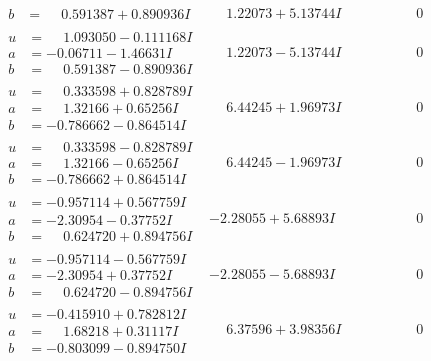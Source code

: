 \documentclass[1p]{elsarticle_modified}
\theoremstyle{definition}
\begin{document}
$$\begin{array}{c|c|c}
\begin{aligned}
b &= \phantom{-}0.591387 + 0.890936 I\end{aligned}
 & \phantom{-}1.22073 + 5.13744 I & \phantom{-0.000000 } 0 \\ \hline\begin{aligned}
u &= \phantom{-}1.093050 - 0.111168 I \\
a &= -0.06711 - 1.46631 I \\
b &= \phantom{-}0.591387 - 0.890936 I\end{aligned}
 & \phantom{-}1.22073 - 5.13744 I & \phantom{-0.000000 } 0 \\ \hline\begin{aligned}
u &= \phantom{-}0.333598 + 0.828789 I \\
a &= \phantom{-}1.32166 + 0.65256 I \\
b &= -0.786662 - 0.864514 I\end{aligned}
 & \phantom{-}6.44245 + 1.96973 I & \phantom{-0.000000 } 0 \\ \hline\begin{aligned}
u &= \phantom{-}0.333598 - 0.828789 I \\
a &= \phantom{-}1.32166 - 0.65256 I \\
b &= -0.786662 + 0.864514 I\end{aligned}
 & \phantom{-}6.44245 - 1.96973 I & \phantom{-0.000000 } 0 \\ \hline\begin{aligned}
u &= -0.957114 + 0.567759 I \\
a &= -2.30954 - 0.37752 I \\
b &= \phantom{-}0.624720 + 0.894756 I\end{aligned}
 & -2.28055 + 5.68893 I & \phantom{-0.000000 } 0 \\ \hline\begin{aligned}
u &= -0.957114 - 0.567759 I \\
a &= -2.30954 + 0.37752 I \\
b &= \phantom{-}0.624720 - 0.894756 I\end{aligned}
 & -2.28055 - 5.68893 I & \phantom{-0.000000 } 0 \\ \hline\begin{aligned}
u &= -0.415910 + 0.782812 I \\
a &= \phantom{-}1.68218 + 0.31117 I \\
b &= -0.803099 - 0.894750 I\end{aligned}
 & \phantom{-}6.37596 + 3.98356 I & \phantom{-0.000000 } 0 \\ \hline\begin{aligned}

\end{aligned}
\end{array}$$
\end{document}
